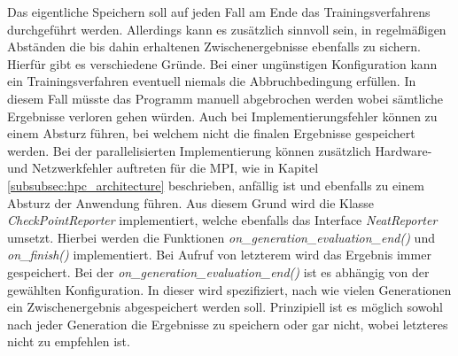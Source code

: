 Das eigentliche Speichern soll auf jeden Fall am Ende das Trainingsverfahrens durchgeführt werden. Allerdings kann es zusätzlich sinnvoll sein, in regelmäßigen Abständen die bis dahin erhaltenen Zwischenergebnisse ebenfalls zu sichern. Hierfür gibt es verschiedene Gründe. Bei einer ungünstigen Konfiguration kann ein Trainingsverfahren eventuell niemals die Abbruchbedingung erfüllen. In diesem Fall müsste das Programm manuell abgebrochen werden wobei sämtliche Ergebnisse verloren gehen würden. Auch bei Implementierungsfehler können zu einem Absturz führen, bei welchem nicht die finalen Ergebnisse gespeichert werden. Bei der parallelisierten Implementierung können zusätzlich Hardware- und Netzwerkfehler auftreten für die \ac{MPI}, wie in Kapitel \ref{subsubsec:hpc_architecture} beschrieben, anfällig ist und ebenfalls zu einem Absturz der Anwendung führen. Aus diesem Grund wird die Klasse \emph{CheckPointReporter} implementiert, welche ebenfalls das Interface \emph{NeatReporter} umsetzt. Hierbei werden die Funktionen \emph{on\_generation\_evaluation\_end()} und \emph{on\_finish()} implementiert. Bei Aufruf von letzterem wird das Ergebnis immer gespeichert. Bei der \emph{on\_generation\_evaluation\_end()} ist es abhängig von der gewählten Konfiguration. In dieser wird spezifiziert, nach wie vielen Generationen ein Zwischenergebnis abgespeichert werden soll. Prinzipiell ist es möglich sowohl nach jeder Generation die Ergebnisse zu speichern oder gar nicht, wobei letzteres nicht zu empfehlen ist.

